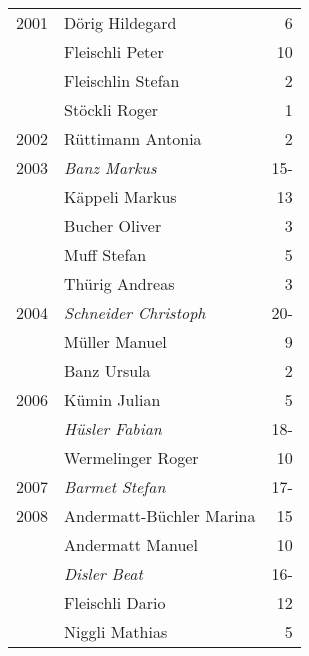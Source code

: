 {\begin{longtable}{ l l r }
        2001          & Dörig Hildegard                           & 6           \\
                      & Fleischli Peter                           & 10          \\
                      & Fleischlin Stefan                         & 2           \\
                      & Stöckli Roger                             & 1           \\
        2002          & Rüttimann Antonia                         & 2           \\
        2003          & \emph{Banz Markus}                        & 15-         \\
                      & Käppeli Markus                            & 13          \\
                      & Bucher Oliver                             & 3           \\
                      & Muff Stefan                               & 5           \\
                      & Thürig Andreas                            & 3           \\
        2004          & \emph{Schneider Christoph}                & 20-         \\
                      & Müller Manuel                             & 9           \\
                      & Banz Ursula                               & 2           \\
        2006          & Kümin Julian                              & 5           \\
                      & \emph{Hüsler Fabian}                      & 18-         \\
                      & Wermelinger Roger                         & 10          \\
        2007          & \emph{Barmet Stefan}                      & 17-         \\
        2008          & Andermatt-Büchler Marina                  & 15          \\
                      & Andermatt Manuel                          & 10          \\
                      & \emph{Disler Beat}                        & 16-         \\
                      & Fleischli Dario                           & 12          \\
                      & Niggli Mathias                            & 5           \\

\end{longtable}}
